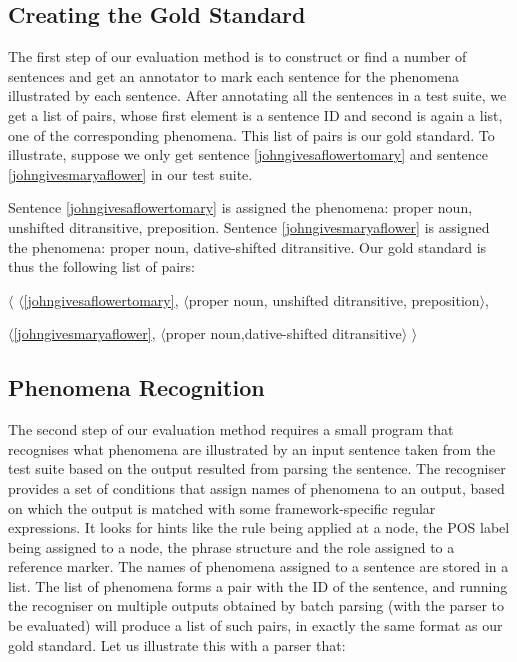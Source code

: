 \documentclass[11pt]{article}
\def\<{$\langle$}
\def\>{$\rangle$}
\begin{document}
\subsection{Creating the Gold Standard} 
The first step of our evaluation method is to construct or find a number of sentences and get an annotator to mark each sentence for the phenomena illustrated by each sentence. After annotating all the sentences in a test suite, we get a list of pairs, whose first element is a sentence ID and second is again a list, one of the corresponding phenomena. This list of pairs is our gold standard. To illustrate, suppose we only get sentence \ref{johngivesaflowertomary} and sentence \ref{johngivesmaryaflower} in our test suite.

\label{johngivesaflowertomary}

\vspace{-7mm}

\label{johngivesmaryaflower}

Sentence \ref{johngivesaflowertomary} is assigned the phenomena: proper noun, unshifted ditransitive, preposition. Sentence \ref{johngivesmaryaflower} is assigned the phenomena: proper noun, dative-shifted ditransitive. Our gold standard is thus the following list of pairs: 

\smallskip

\< \<\ref{johngivesaflowertomary}, $\langle{}${\smaller proper noun, unshifted ditransitive, preposition}\>,

\hspace{1.5mm} \<\ref{johngivesmaryaflower}, $\langle{}${\smaller proper noun,dative-shifted ditransitive}$\rangle$ 
$\rangle$



\subsection{Phenomena Recognition}


The second step of our evaluation method requires a small program that recognises what phenomena are illustrated by an input sentence taken from the test suite based on the output resulted from parsing the sentence. The recogniser provides a set of conditions that assign names of phenomena to an output, based on which the output is matched with some framework-specific regular expressions. It looks for hints like the rule being applied at a node, the POS label being assigned to a node, the phrase structure and the role assigned to a reference marker. The names of phenomena assigned to a sentence are stored in a list. The list of phenomena forms a pair with the ID of the sentence, and running the recogniser on multiple outputs obtained by batch parsing (with the parser to be evaluated) will produce a list of such pairs, in exactly the same format as our gold standard. Let us illustrate this with a parser that:
\end{document}
